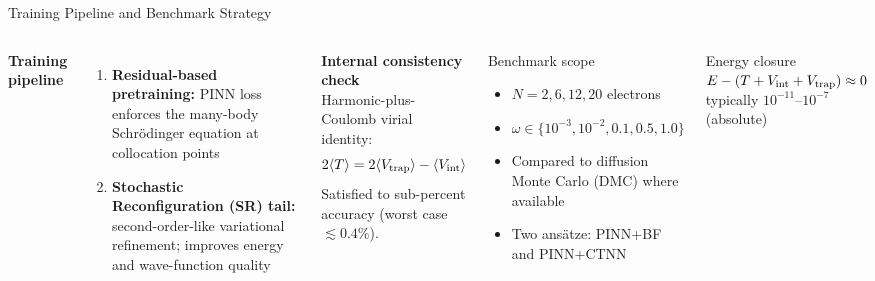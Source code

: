 \documentclass[aspectratio=169,10pt]{beamer}
\begin{document}
\begin{frame}{Training Pipeline and Benchmark Strategy}
  \begin{columns}[T]
      \textbf{Training pipeline}
      \begin{enumerate}
        \item \textbf{Residual-based pretraining:}
              PINN loss enforces the many-body Schr\"odinger equation
              at collocation points
        \item \textbf{Stochastic Reconfiguration (SR) tail:}
              second-order-like variational refinement; improves energy
              and wave-function quality
      \end{enumerate}
      \vspace{0.3cm}
      \textbf{Internal consistency check}\\
      Harmonic-plus-Coulomb virial identity:
      \[
        2\langle T\rangle = 2\langle V_{\rm trap}\rangle
        - \langle V_{\rm int}\rangle
      \]
      Satisfied to sub-percent accuracy (worst case $\lesssim 0.4\%$).
      \begin{block}{Benchmark scope}
        \begin{itemize}
          \item $N=2,6,12,20$ electrons
          \item $\omega\in\{10^{-3},10^{-2},0.1,0.5,1.0\}$
          \item Compared to diffusion Monte Carlo (DMC) where available
          \item Two ans\"atze: PINN+BF and PINN+CTNN
        \end{itemize}
      \end{block}
      \vspace{0.3cm}
      \begin{alertblock}{Energy closure}
        $E-(T+V_{\rm int}+V_{\rm trap})\approx 0$\\
        typically $10^{-11}$--$10^{-7}$ (absolute)
      \end{alertblock}
  \end{columns}
\end{frame}


\end{document}
